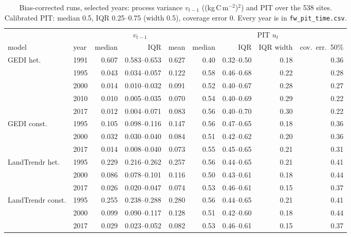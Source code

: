 \documentclass[11pt]{article}
\newcommand{\code}[1]{\texttt{#1}}
\begin{document}
\begin{table}[ht]
  \centering\small
  \begin{tabular}{llrrrrrrr}
    \toprule
    & & \multicolumn{3}{c}{$v_{t-1}$} & \multicolumn{4}{c}{PIT $u_t$} \\
    \cmidrule(lr){3-5} \cmidrule(lr){6-9}
    model & year & median & IQR & mean & median & IQR & IQR width & cov.\ err.\ 50\% \\
    \midrule
    GEDI het.        & 1991 & 0.607 & 0.583--0.653 & 0.627 & 0.40 & 0.32--0.50 & 0.18 & 0.36 \\
                     & 1995 & 0.043 & 0.034--0.057 & 0.122 & 0.58 & 0.46--0.68 & 0.22 & 0.28 \\
                     & 2000 & 0.014 & 0.010--0.032 & 0.091 & 0.52 & 0.40--0.67 & 0.28 & 0.27 \\
                     & 2010 & 0.010 & 0.005--0.035 & 0.070 & 0.54 & 0.40--0.69 & 0.29 & 0.22 \\
                     & 2017 & 0.012 & 0.004--0.071 & 0.083 & 0.56 & 0.40--0.70 & 0.30 & 0.22 \\
    \addlinespace
    GEDI const.      & 1995 & 0.105 & 0.098--0.116 & 0.147 & 0.56 & 0.47--0.65 & 0.18 & 0.36 \\
                     & 2000 & 0.032 & 0.030--0.040 & 0.084 & 0.51 & 0.42--0.62 & 0.20 & 0.36 \\
                     & 2017 & 0.014 & 0.008--0.040 & 0.073 & 0.55 & 0.45--0.65 & 0.21 & 0.31 \\
    \addlinespace
    LandTrendr het.  & 1995 & 0.229 & 0.216--0.262 & 0.257 & 0.56 & 0.44--0.65 & 0.21 & 0.41 \\
                     & 2000 & 0.086 & 0.078--0.101 & 0.116 & 0.50 & 0.43--0.61 & 0.18 & 0.44 \\
                     & 2017 & 0.026 & 0.020--0.047 & 0.074 & 0.53 & 0.46--0.61 & 0.15 & 0.37 \\
    \addlinespace
    LandTrendr const.& 1995 & 0.255 & 0.238--0.288 & 0.280 & 0.56 & 0.44--0.65 & 0.21 & 0.41 \\
                     & 2000 & 0.099 & 0.090--0.117 & 0.128 & 0.51 & 0.42--0.60 & 0.18 & 0.44 \\
                     & 2017 & 0.029 & 0.023--0.052 & 0.082 & 0.53 & 0.46--0.61 & 0.15 & 0.37 \\
    \bottomrule
  \end{tabular}
  \caption{Bias-corrected runs, selected years: process variance $v_{t-1}$
  ((kg\,C\,m$^{-2}$)$^2$) and PIT over the 538 sites. Calibrated PIT: median 0.5, IQR
  0.25--0.75 (width 0.5), coverage error 0. Every year is in \code{fw\_pit\_time.csv}.}
  \label{tab:years}
\end{table}
\end{document}
